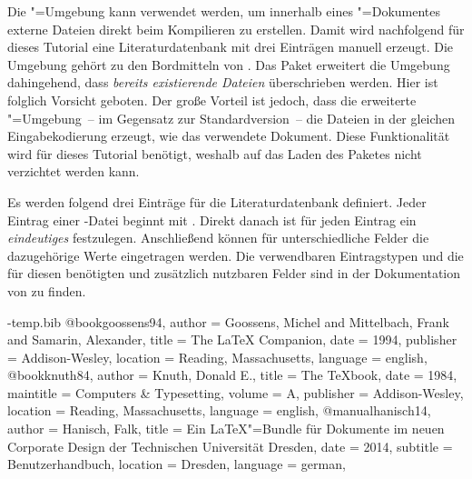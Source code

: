 \documentclass[%
  english,ngerman,%
  cdgeometry=no,DIV=12,automark,%
]{tudscrartcl}
\begin{document}
Die "=Umgebung kann verwendet werden, um innerhalb 
eines "=Dokumentes externe Dateien direkt beim Kompilieren zu
erstellen. Damit wird nachfolgend für dieses Tutorial eine Literaturdatenbank 
 mit drei Einträgen manuell erzeugt. Die Umgebung 
gehört zu den Bordmitteln von . Das Paket  
erweitert die Umgebung dahingehend, dass \emph{bereits existierende Dateien} 
überschrieben werden. Hier ist folglich Vorsicht geboten. Der große Vorteil ist 
jedoch, dass die erweiterte "=Umgebung~-- im 
Gegensatz zur Standardversion~-- die Dateien in der gleichen Eingabekodierung 
erzeugt, wie das verwendete Dokument. Diese Funktionalität wird für dieses 
Tutorial benötigt, weshalb auf das Laden des Paketes  
nicht verzichtet werden kann. 
%
\begin{Preamble}
\usepackage{filecontents}
\end{Preamble}
%
Es werden folgend drei Einträge für die Literaturdatenbank definiert. Jeder 
Eintrag einer -Datei beginnt mit . 
Direkt danach ist für jeden Eintrag ein \emph{eindeutiges}  
festzulegen. Anschließend können für unterschiedliche Felder die dazugehörige 
Werte eingetragen werden. Die verwendbaren Eintragstypen und die für diesen 
benötigten und zusätzlich nutzbaren Felder sind in der Dokumentation von 
 zu finden.
%
\begin{Preamble*}
\begin{filecontents}{\jobname-temp.bib}
@book{goossens94,
  author    = {Goossens, Michel and Mittelbach, Frank
               and Samarin, Alexander},
  title     = {The LaTeX Companion},
  date      = {1994},
  publisher = {Addison-Wesley},
  location  = {Reading, Massachusetts},
  language  = {english},
}
@book{knuth84,
  author    = {Knuth, Donald E.},
  title     = {The \TeX book},
  date      = {1984},
  maintitle = {Computers \& Typesetting},
  volume    = {A},
  publisher = {Addison-Wesley},
  location  = {Reading, Massachusetts},
  language  = {english},
}
@manual{hanisch14,
  author    = {Hanisch, Falk},
  title     = {Ein \LaTeX"=Bundle für Dokumente
               im neuen Corporate Design 
               der Technischen Universität Dresden},
  date      = {2014},
  subtitle  = {Benutzerhandbuch},
  location  = {Dresden},
  language  = {german},
}
\end{filecontents}
\end{Preamble*}
\end{document}
